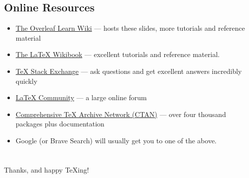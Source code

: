 \documentclass[aspectratio=169]{beamer}
\begin{document}
\subsection{Online Resources}
\begin{frame}{\insertsubsection}
\begin{itemize}
\item \href{https://www.overleaf.com/learn}{The Overleaf Learn Wiki} ---
hosts these slides, more tutorials and reference material
\item \href{http://en.wikibooks.org/wiki/LaTeX}{The \LaTeX{} Wikibook} ---
excellent tutorials and reference material.
\item \href{http://tex.stackexchange.com/}{\TeX{} Stack Exchange} --- ask
questions and get excellent answers incredibly quickly
\item \href{http://www.latex-community.org/}{\LaTeX{} Community} --- a large
online forum
\item \href{http://ctan.org/}{Comprehensive \TeX{} Archive Network (CTAN)} ---
over four thousand packages plus documentation
\item Google (or Brave Search) will usually get you to one of the above.
\end{itemize}
\end{frame}

\section*{}
\begin{frame}
\begin{center}
Thanks, and happy \TeX{}ing!
\end{center}
\end{frame}


\end{document}
